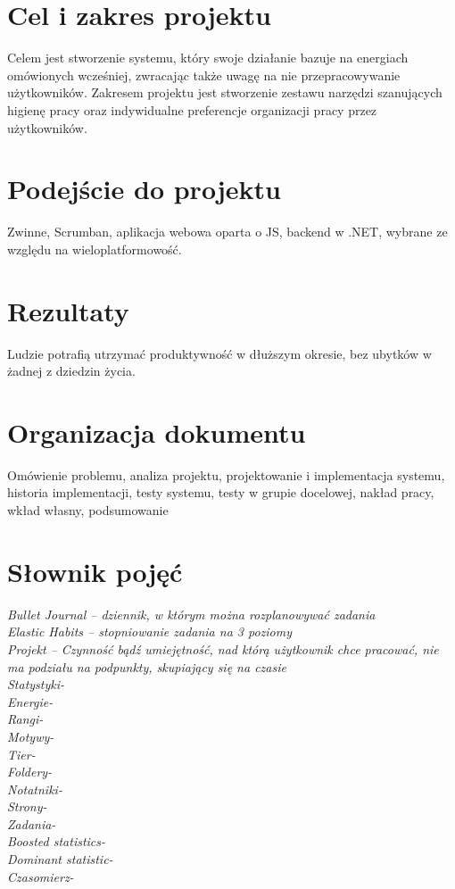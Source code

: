 \documentclass[a4paper,11pt]{report}
\begin{document}
\section{Cel i zakres projektu}
Celem jest stworzenie systemu, który swoje działanie bazuje na energiach omówionych wcześniej,
 zwracając także uwagę na nie przepracowywanie użytkowników.
\vspace{0,5cm}
Zakresem projektu jest stworzenie zestawu narzędzi szanujących higienę pracy
 oraz indywidualne preferencje organizacji pracy przez użytkowników.

\section{Podejście do projektu}
Zwinne, Scrumban, aplikacja webowa oparta o JS, backend w .NET, wybrane ze względu na wieloplatformowość.

\section{Rezultaty}
Ludzie potrafią utrzymać produktywność w dłuższym okresie, bez ubytków w żadnej z dziedzin życia.

\section{Organizacja dokumentu}
Omówienie problemu, analiza projektu, projektowanie i implementacja systemu, historia implementacji,
 testy systemu, testy w grupie docelowej, nakład pracy, wkład własny, podsumowanie

\section {Słownik pojęć}
	\emph{Bullet Journal – dziennik, w którym można rozplanowywać zadania}\\
	\emph{Elastic Habits – stopniowanie zadania na 3 poziomy}\\
	\emph{Projekt – Czynność bądź umiejętność, nad którą użytkownik chce pracować, nie ma podziału na podpunkty, skupiający się na czasie}\\
	\emph{Statystyki-}\\
	\emph{Energie-}\\
	\emph{Rangi-}\\
	\emph{Motywy-}\\
	\emph{Tier-}\\
	\emph{Foldery-}\\
	\emph{Notatniki-}\\
	\emph{Strony-}\\
	\emph{Zadania-}\\
	\emph{Boosted statistics-}\\
	\emph{Dominant statistic-}\\
	\emph{Czasomierz-}\\
	
\end{document}
